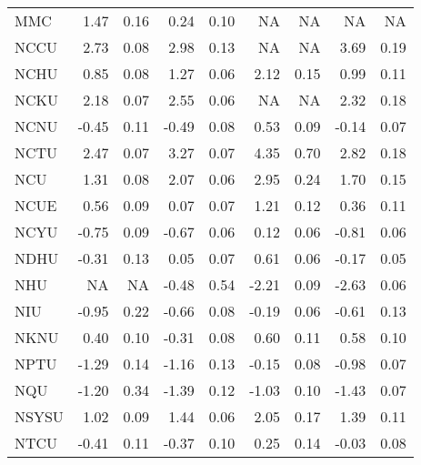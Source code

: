 \begin{longtable}[t]{lrrrrrrrr}
\hspace{1em}MMC & 1.47 & 0.16 & 0.24 & 0.10 & NA & NA & NA & NA\\
\hspace{1em}NCCU & 2.73 & 0.08 & 2.98 & 0.13 & NA & NA & 3.69 & 0.19\\
\hspace{1em}NCHU & 0.85 & 0.08 & 1.27 & 0.06 & 2.12 & 0.15 & 0.99 & 0.11\\
\hspace{1em}NCKU & 2.18 & 0.07 & 2.55 & 0.06 & NA & NA & 2.32 & 0.18\\
\hspace{1em}NCNU & -0.45 & 0.11 & -0.49 & 0.08 & 0.53 & 0.09 & -0.14 & 0.07\\
\hspace{1em}NCTU & 2.47 & 0.07 & 3.27 & 0.07 & 4.35 & 0.70 & 2.82 & 0.18\\
\hspace{1em}NCU & 1.31 & 0.08 & 2.07 & 0.06 & 2.95 & 0.24 & 1.70 & 0.15\\
\hspace{1em}NCUE & 0.56 & 0.09 & 0.07 & 0.07 & 1.21 & 0.12 & 0.36 & 0.11\\
\hspace{1em}NCYU & -0.75 & 0.09 & -0.67 & 0.06 & 0.12 & 0.06 & -0.81 & 0.06\\
\hspace{1em}NDHU & -0.31 & 0.13 & 0.05 & 0.07 & 0.61 & 0.06 & -0.17 & 0.05\\
\hspace{1em}NHU & NA & NA & -0.48 & 0.54 & -2.21 & 0.09 & -2.63 & 0.06\\
\hspace{1em}NIU & -0.95 & 0.22 & -0.66 & 0.08 & -0.19 & 0.06 & -0.61 & 0.13\\
\hspace{1em}NKNU & 0.40 & 0.10 & -0.31 & 0.08 & 0.60 & 0.11 & 0.58 & 0.10\\
\hspace{1em}NPTU & -1.29 & 0.14 & -1.16 & 0.13 & -0.15 & 0.08 & -0.98 & 0.07\\
\hspace{1em}NQU & -1.20 & 0.34 & -1.39 & 0.12 & -1.03 & 0.10 & -1.43 & 0.07\\
\hspace{1em}NSYSU & 1.02 & 0.09 & 1.44 & 0.06 & 2.05 & 0.17 & 1.39 & 0.11\\
\hspace{1em}NTCU & -0.41 & 0.11 & -0.37 & 0.10 & 0.25 & 0.14 & -0.03 & 0.08\\

\end{longtable}

